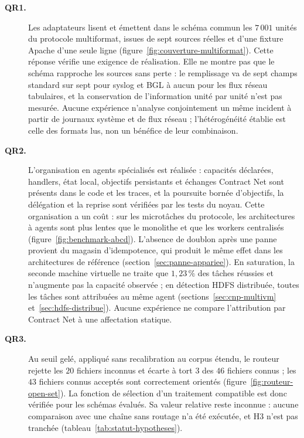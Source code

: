 \begin{description}

    \item[\textbf{QR1.}]
    Les adaptateurs lisent et émettent dans le schéma commun les $7\,001$ unités du protocole multiformat, issues de sept sources réelles et d'une fixture Apache d'une seule ligne (figure~\ref{fig:couverture-multiformat}). Cette réponse vérifie une exigence de réalisation. Elle ne montre pas que le schéma rapproche les sources sans perte : le remplissage va de sept champs standard sur sept pour syslog et BGL à aucun pour les flux réseau tabulaires, et la conservation de l'information unité par unité n'est pas mesurée. Aucune expérience n'analyse conjointement un même incident à partir de journaux système et de flux réseau ; l'hétérogénéité établie est celle des formats lus, non un bénéfice de leur combinaison.

    \item[\textbf{QR2.}]
    L'organisation en agents spécialisés est réalisée : capacités déclarées, handlers, état local, objectifs persistants et échanges Contract Net sont présents dans le code et les traces, et la poursuite bornée d'objectifs, la délégation et la reprise sont vérifiées par les tests du noyau. Cette organisation a un coût : sur les microtâches du protocole, les architectures à agents sont plus lentes que le monolithe et que les workers centralisés (figure~\ref{fig:benchmark-abcd}). L'absence de doublon après une panne provient du magasin d'idempotence, qui produit le même effet dans les architectures de référence (section~\ref{sec:panne-appariee}). En saturation, la seconde machine virtuelle ne traite que $1{,}23\,\%$ des tâches réussies et n'augmente pas la capacité observée ; en détection HDFS distribuée, toutes les tâches sont attribuées au même agent (sections~\ref{sec:cnp-multivm} et~\ref{sec:hdfs-distribue}). Aucune expérience ne compare l'attribution par Contract Net à une affectation statique.

    \item[\textbf{QR3.}]
    Au seuil gelé, appliqué sans recalibration au corpus étendu, le routeur rejette les $20$ fichiers inconnus et écarte à tort $3$ des $46$ fichiers connus ; les $43$ fichiers connus acceptés sont correctement orientés (figure~\ref{fig:routeur-open-set}). La fonction de sélection d'un traitement compatible est donc vérifiée pour les schémas évalués. Sa valeur relative reste inconnue : aucune comparaison avec une chaîne sans routage n'a été exécutée, et H3 n'est pas tranchée (tableau~\ref{tab:statut-hypotheses}).


\end{description}
